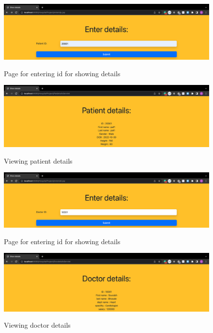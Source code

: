 \documentclass[12pt]{article}
\begin{document}
\newpage

\begin{figure}[!hbt]
    \centering
    \includegraphics[scale=0.35]{screenshots/6a.png}
    \label{fig:data}
    \caption{Page for entering id for showing details}
\end{figure}

\vspace{15mm}

\begin{figure}[!hbt]
    \centering
    \includegraphics[scale=0.35]{screenshots/6b.png}
    \label{fig:my_label1}
    \caption{Viewing patient details}
\end{figure}

\newpage

\begin{figure}[!hbt]
    \centering
    \includegraphics[scale=0.35]{screenshots/6c.png}
    \label{fig:data}
    \caption{Page for entering id for showing details}
\end{figure}

\vspace{15mm}

\begin{figure}[!hbt]
    \centering
    \includegraphics[scale=0.35]{screenshots/6d.png}
    \label{fig:my_label1}
    \caption{Viewing doctor details}
\end{figure}
\end{document}
